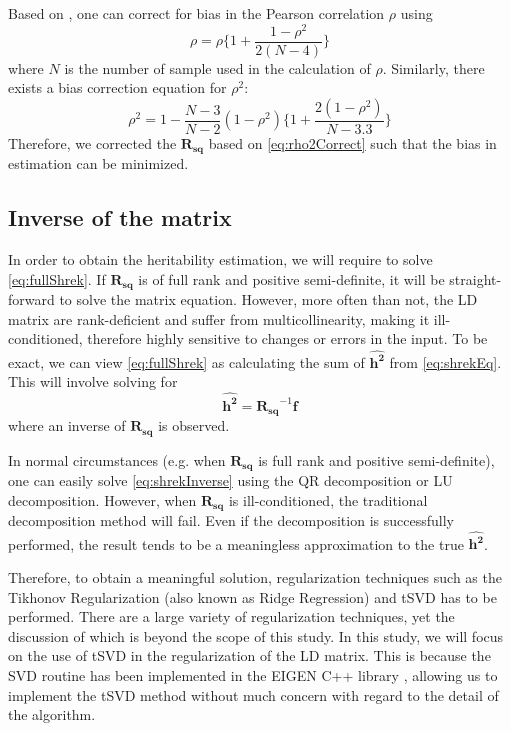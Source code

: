 			Based on \citet{Shieh2010}, one can correct for bias in the Pearson correlation $\rho$ using
			\begin{equation}
			\rho = \rho\{1+\frac{1-\rho^2}{2(N-4)}\}
			\label{eq:rhoCorrect}
			\end{equation}
			where $N$ is the number of sample used in the calculation of $\rho$. 
			Similarly, there exists a bias correction equation for $\rho^2$:
			\begin{equation}
				\rho^2=1-\frac{N-3}{N-2}(1-\rho^2)\{1+\frac{2(1-\rho^2)}{N-3.3}\}
				\label{eq:rho2Correct}
			\end{equation}
			Therefore, we corrected the $\boldsymbol{R_{sq}}$ based on \cref{eq:rho2Correct} such that the bias in estimation can be minimized. 
		\subsection{Inverse of the  matrix}
			In order to obtain the heritability estimation, we will require to solve \cref{eq:fullShrek}. 
			If $\boldsymbol{R_{sq}}$ is of full rank and positive semi-definite, it will be straight-forward to solve the matrix equation.
			However, more often than not, the \gls{LD} matrix are rank-deficient and suffer from multicollinearity, making it ill-conditioned, therefore highly sensitive to changes or errors in the input.
			To be exact, we can view \cref{eq:fullShrek} as calculating the sum of $\boldsymbol{\hat{h^2}}$ from  \cref{eq:shrekEq}.
			This will involve solving for
			\begin{equation}
			\boldsymbol{\hat{h^2}} = \boldsymbol{R_{sq}}^{-1}\boldsymbol{f}
			\label{eq:shrekInverse}
			\end{equation}
			where an inverse of $\boldsymbol{R_{sq}}$ is observed. 
			
			In normal circumstances (e.g. when $\boldsymbol{R_{sq}}$ is full rank and positive semi-definite), one can easily solve \cref{eq:shrekInverse} using the QR decomposition or LU decomposition.
			However, when $\boldsymbol{R_{sq}}$ is ill-conditioned, the traditional decomposition method will fail.
			Even if the decomposition is successfully performed, the result tends to be a meaningless approximation to the true $\boldsymbol{\hat{h^2}}$. 
			
			Therefore, to obtain a meaningful solution, regularization techniques such as the Tikhonov Regularization (also known as Ridge Regression) and \gls{tSVD} has to be performed\parencite{Neumaier1998}. 
			There are a large variety of regularization techniques, yet the discussion of which is beyond the scope of this study. 
			In this study, we will focus on the use of \gls{tSVD} in the regularization of the \gls{LD} matrix.
			This is because the \gls{SVD} routine has been implemented in the EIGEN C++ library \parencite{eigenweb}, allowing us to implement the \gls{tSVD} method without much concern with regard to the detail of the algorithm. 
			
